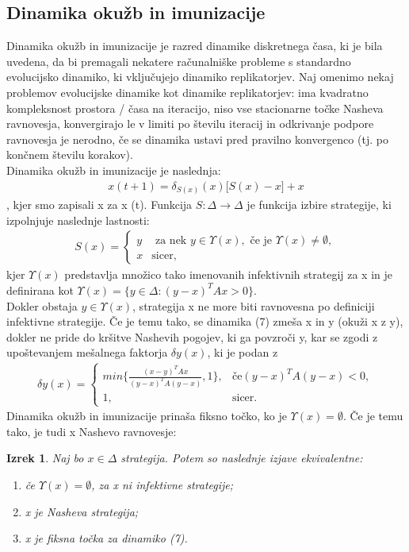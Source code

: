 \documentclass[a4paper]{article}
\newtheorem{theorem}{Izrek}
\begin{document}
\subsection{Dinamika okužb in imunizacije}
Dinamika okužb in imunizacije je razred dinamike diskretnega časa, ki je bila uvedena, da bi premagali nekatere računalniške probleme s standardno evolucijsko dinamiko, ki vključujejo dinamiko replikatorjev. Naj omenimo nekaj problemov evolucijske dinamike kot dinamike replikatorjev: ima kvadratno kompleksnost prostora / časa na iteracijo, niso vse stacionarne točke Nasheva ravnovesja, konvergirajo le v limiti po številu iteracij in odkrivanje podpore ravnovesja je nerodno, če se dinamika ustavi pred pravilno konvergenco (tj. po končnem številu korakov).\\
Dinamika okužb in imunizacije je naslednja:
\begin{gather} x(t + 1) = \delta_{S(x)}(x)\lbrack S(x) - x\rbrack + x \end{gather},
kjer smo zapisali x za x (t). Funkcija $S:\Delta\rightarrow\Delta$ je funkcija izbire strategije, ki izpolnjuje naslednje lastnosti:
\begin{gather}
S (x) = \begin{cases}
y & \text{ za nek } y \in \Upsilon (x), \text{ če je } \Upsilon (x) \not= \emptyset, \\
x & \text{sicer,} \end{cases} \end{gather}
kjer $\Upsilon(x)$ predstavlja množico tako imenovanih infektivnih strategij za x in je definirana kot $\Upsilon(x) = \{y \in\Delta : (y - x)^T A x> 0\}$.\\
Dokler obstaja $y \in\Upsilon (x)$, strategija x ne more biti ravnovesna po definiciji infektivne strategije. Če je temu tako, se dinamika (7) zmeša x in y (okuži x z y), dokler ne pride do kršitve Nashevih pogojev, ki ga povzroči y, kar se zgodi z upoštevanjem mešalnega faktorja $\delta y (x)$, ki je podan z
\begin{gather}
\delta y (x) =
\begin{cases}
min\{\frac{(x-y)^T A x}{(y-x)^T A (y-x)}, 1\} ,& \text{če} (y - x)^T A (y - x) <0,\\
1, & \text{sicer.}
\end{cases}
\end{gather}
Dinamika okužb in imunizacije prinaša fiksno točko, ko je $\Upsilon(x) = \emptyset$. Če je temu tako, je tudi x Nashevo ravnovesje:
\begin{theorem}
Naj bo $x \in\Delta$ strategija. Potem so naslednje izjave ekvivalentne: 
\begin{enumerate}
\item če $\Upsilon(x) = \emptyset$, za x ni infektivne strategije; 
\item x je Nasheva strategija; 
\item x je fiksna točka za dinamiko (7).
\end{enumerate}
\end{theorem}
\end{document}
